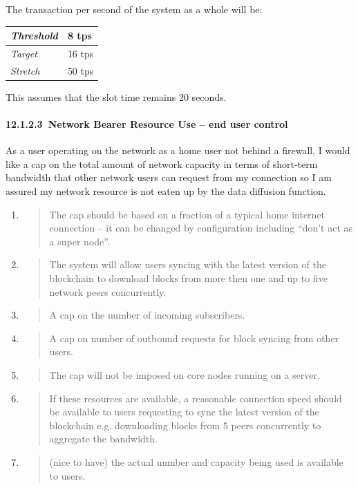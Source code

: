 \documentclass[11pt,a4paper]{article}
\begin{document}
The transaction per second of the system as a whole will be:

\begin{longtable}[]{@{}ll@{}}
\toprule
\emph{Threshold} & 8 tps\tabularnewline
\midrule
\endhead
\emph{Target} & 16 tps\tabularnewline
\emph{Stretch} & 50 tps\tabularnewline
\bottomrule
\end{longtable}

This assumes that the slot time remains 20 seconds.

\hypertarget{network-bearer-resource-use-end-user-control}{%
\paragraph{​12.1.2.3​~Network Bearer Resource Use -- end user
control}\label{network-bearer-resource-use-end-user-control}}

As a user operating on the network as a home user not behind a firewall,
I would like a cap on the total amount of network capacity in terms of
short-term bandwidth that other network users can request from my
connection so I am assured my network resource is not eaten up by the
data diffusion function.

\begin{enumerate}
\def\labelenumi{\arabic{enumi}.}
\item
  \begin{quote}
  The cap should be based on a fraction of a typical home internet
  connection -- it can be changed by configuration including ``don't act
  as a super node''.
  \end{quote}
\item
  \begin{quote}
  The system will allow users syncing with the latest version of the
  blockchain to download blocks from more then one and up to five
  network peers concurrently.
  \end{quote}
\item
  \begin{quote}
  A cap on the number of incoming subscribers.
  \end{quote}
\item
  \begin{quote}
  A cap on number of outbound requests for block syncing from other
  users.
  \end{quote}
\item
  \begin{quote}
  The cap will not be imposed on core nodes running on a server.
  \end{quote}
\item
  \begin{quote}
  If these resources are available, a reasonable connection speed should
  be available to users requesting to sync the latest version of the
  blockchain e.g. downloading blocks from 5 peers concurrently to
  aggregate the bandwidth.
  \end{quote}
\item
  \begin{quote}
  (nice to have) the actual number and capacity being used is available
  to users.
  \end{quote}
\end{enumerate}
\end{document}

